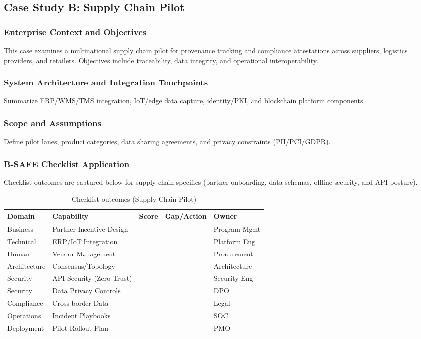 \subsection{Case Study B: Supply Chain Pilot}

\subsubsection{Enterprise Context and Objectives}
This case examines a multinational supply chain pilot for provenance tracking and compliance attestations across suppliers, logistics providers, and retailers. Objectives include traceability, data integrity, and operational interoperability.

\subsubsection{System Architecture and Integration Touchpoints}
Summarize ERP/WMS/TMS integration, IoT/edge data capture, identity/PKI, and blockchain platform components.

\subsubsection{Scope and Assumptions}
Define pilot lanes, product categories, data sharing agreements, and privacy constraints (PII/PCI/GDPR).

\subsubsection{B-SAFE Checklist Application}
Checklist outcomes are captured below for supply chain specifics (partner onboarding, data schemas, offline security, and API posture).

\begin{table}[H]
\centering
\caption{Checklist outcomes (Supply Chain Pilot)}
\begin{tabularx}{0.98\linewidth}{l l c X l}
\toprule
\textbf{Domain} & \textbf{Capability} & \textbf{Score} & \textbf{Gap/Action} & \textbf{Owner} \\
\midrule
Business & Partner Incentive Design &  &  & Program Mgmt \\
Technical & ERP/IoT Integration &  &  & Platform Eng \\
Human & Vendor Management &  &  & Procurement \\
Architecture & Consensus/Topology &  &  & Architecture \\
Security & API Security (Zero Trust) &  &  & Security Eng \\
Security & Data Privacy Controls &  &  & DPO \\
Compliance & Cross-border Data &  &  & Legal \\
Operations & Incident Playbooks &  &  & SOC \\
Deployment & Pilot Rollout Plan &  &  & PMO \\
\bottomrule
\end{tabularx}
\label{tab:sc_checklist}
\end{table}

